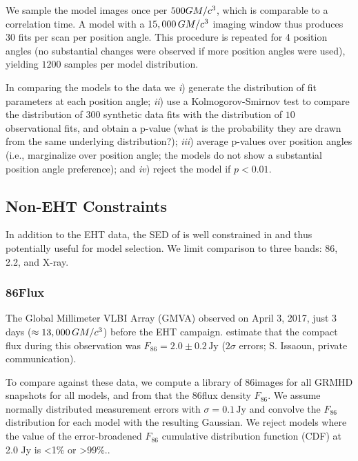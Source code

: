 We sample the model images once per $500GM/c^3$, which is comparable to a correlation time.  A model with a $15,000\,GM/c^3$ imaging window thus produces $30$ fits per scan per position angle.  This procedure is repeated for 4 position angles (no substantial changes were observed if more position angles were used), yielding $1200$ samples per model distribution.

In comparing the models to the data we
\emph{i}) generate the distribution of fit parameters at each position angle;
\emph{ii}) use a Kolmogorov-Smirnov test to compare the distribution of $300$ synthetic data fits with the distribution of $10$ observational fits, and obtain a p-value (what is the probability they are drawn from the same underlying distribution?);
\emph{iii}) average p-values over position angles (i.e., marginalize over position angle; the models do not show a substantial position angle preference); and
\emph{iv}) reject the model if $p < 0.01$.

\subsection{Non-EHT Constraints}

In addition to the EHT data, the SED of \sgra is well constrained in  and thus potentially useful for model selection.
We limit comparison to three bands: 86\GHz, 2.2\um, and X-ray.

\subsubsection{86\GHz Flux}

The Global Millimeter VLBI Array (GMVA) observed \sgra on April 3, 2017, just 3 days ($\approx 13,000 \,GM/c^3$) before the EHT campaign.
\citet{2019ApJ...871...30I} estimate that the compact flux during this observation was $F_{86} = 2.0 \pm 0.2\,\mathrm{Jy}$ ($2\sigma$ errors; S. Issaoun, private communication).

To compare against these data, we compute a library of 86\GHz images for all GRMHD snapshots for all models, and from that the 86\GHz flux density $F_{86}$.  We assume normally distributed measurement errors with $\sigma = 0.1\,\mathrm{Jy}$ and convolve the $F_{86}$ distribution for each model with the resulting Gaussian.  We reject models where the value of the error-broadened $F_{86}$ cumulative distribution function (CDF) at 2.0 Jy is <1\% or >99\%..


